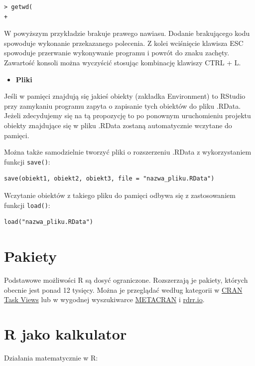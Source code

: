 \documentclass[]{book}
\providecommand{\tightlist}{%
  \setlength{\itemsep}{0pt}\setlength{\parskip}{0pt}}
\begin{document}
\begin{verbatim}
> getwd(
+ 
\end{verbatim}

W powyższym przykładzie brakuje prawego nawiasu. Dodanie brakującego
kodu spowoduje wykonanie przekazanego polecenia. Z kolei wciśnięcie
klawisza ESC spowoduje przerwanie wykonywanie programu i powrót do znaku
zachęty. Zawartość konsoli można wyczyścić stosując kombinację klawiszy
CTRL + L.

\begin{itemize}
\tightlist
\item
  \textbf{Pliki }
\end{itemize}

Jeśli w pamięci znajdują się jakieś obiekty (zakładka Environment) to
RStudio przy zamykaniu programu zapyta o zapisanie tych obiektów do
pliku .RData. Jeżeli zdecydujemy się na tą propozycję to po ponownym
uruchomieniu projektu obiekty znajdujące się w pliku .RData zostaną
automatycznie wczytane do pamięci.

Można także samodzielnie tworzyć pliki o rozszerzeniu .RData z
wykorzystaniem funkcji \texttt{save()}:

\begin{verbatim}
save(obiekt1, obiekt2, obiekt3, file = "nazwa_pliku.RData")
\end{verbatim}

Wczytanie obiektów z takiego pliku do pamięci odbywa się z zastosowaniem
funkcji \texttt{load()}:

\begin{verbatim}
load("nazwa_pliku.RData")
\end{verbatim}

\section{Pakiety}\label{pakiety}

Podstawowe możliwości R są dosyć ograniczone. Rozszerzają je pakiety,
których obecnie jest ponad 12 tysięcy. Można je przeglądać według
kategorii w \href{https://cran.r-project.org/web/views/}{CRAN Task
Views} lub w wygodnej wyszukiwarce
\href{https://www.r-pkg.org/}{METACRAN} i
\href{https://rdrr.io/}{rdrr.io}.

\section{R jako kalkulator}\label{r-jako-kalkulator}

Działania matematycznie w R:
\end{document}
